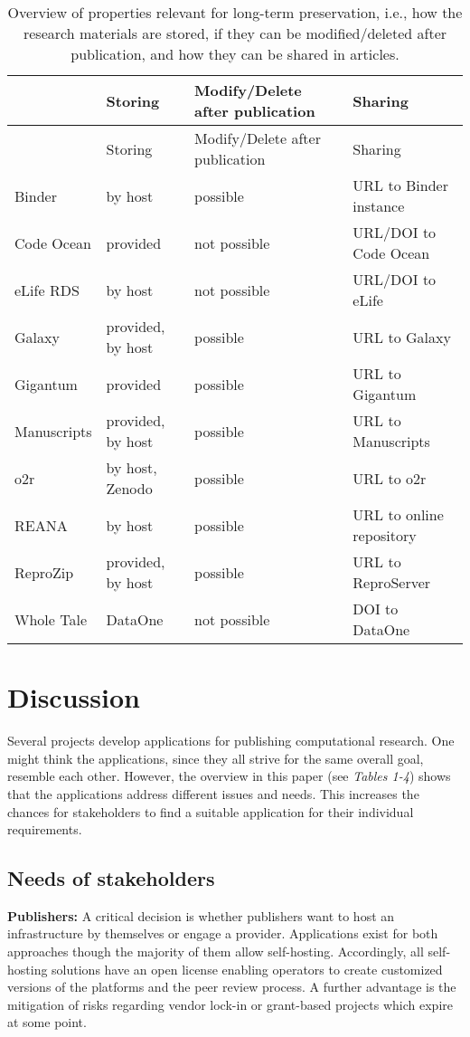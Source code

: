 \documentclass[onecolumn]{article}
\begin{document}
\begin{longtable}[]{@{}llll@{}}
\caption{Overview of properties relevant for long-term preservation,
i.e., how the research materials are stored, if they can be
modified/deleted after publication, and how they can be shared in
articles.}\tabularnewline
\toprule
& Storing & Modify/Delete after publication & Sharing\tabularnewline
\midrule
\endfirsthead
\toprule
& Storing & Modify/Delete after publication & Sharing\tabularnewline
\midrule
\endhead
Binder & by host & possible & URL to Binder instance\tabularnewline
Code Ocean & provided & not possible & URL/DOI to Code
Ocean\tabularnewline
eLife RDS & by host & not possible & URL/DOI to eLife\tabularnewline
Galaxy & provided, by host & possible & URL to Galaxy\tabularnewline
Gigantum & provided & possible & URL to Gigantum\tabularnewline
Manuscripts & provided, by host & possible & URL to
Manuscripts\tabularnewline
o2r & by host, Zenodo & possible & URL to o2r\tabularnewline
REANA & by host & possible & URL to online repository\tabularnewline
ReproZip & provided, by host & possible & URL to
ReproServer\tabularnewline
Whole Tale & DataOne & not possible & DOI to DataOne\tabularnewline
\bottomrule
\end{longtable}

\hypertarget{discussion}{%
\section{Discussion}\label{discussion}}

Several projects develop applications for publishing computational
research. One might think the applications, since they all strive for
the same overall goal, resemble each other. However, the overview in
this paper (see \emph{Tables 1-4}) shows that the applications address
different issues and needs. This increases the chances for stakeholders
to find a suitable application for their individual requirements.

\hypertarget{needs-of-stakeholders}{%
\subsection{Needs of stakeholders}\label{needs-of-stakeholders}}

\textbf{Publishers:} A critical decision is whether publishers want to
host an infrastructure by themselves or engage a provider. Applications
exist for both approaches though the majority of them allow
self-hosting. Accordingly, all self-hosting solutions have an open
license enabling operators to create customized versions of the
platforms and the peer review process. A further advantage is the
mitigation of risks regarding vendor lock-in or grant-based projects
which expire at some point.
\end{document}
